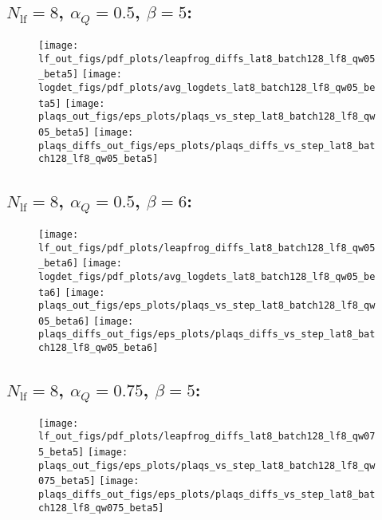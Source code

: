 \clearpage
\subsection{\texorpdfstring{$N_{\mathrm{lf}} = 8$}{Nlf = 8}, \texorpdfstring{$\alpha_Q = 0.5$}{alphaq = 0.5},
\texorpdfstring{$\beta = 5$}{beta = 5}:}
%
\begin{figure}[htpb]
  \centering
  \texttt{[image: lf\_out\_figs/pdf\_plots/leapfrog\_diffs\_lat8\_batch128\_lf8\_qw05\_beta5]}
  \hfill
  \texttt{[image: logdet\_figs/pdf\_plots/avg\_logdets\_lat8\_batch128\_lf8\_qw05\_beta5]}
  \hfill
  \texttt{[image: plaqs\_out\_figs/eps\_plots/plaqs\_vs\_step\_lat8\_batch128\_lf8\_qw05\_beta5]}
  \hfill
  \texttt{[image: plaqs\_diffs\_out\_figs/eps\_plots/plaqs\_diffs\_vs\_step\_lat8\_batch128\_lf8\_qw05\_beta5]}
\end{figure}

\clearpage
\subsection{\texorpdfstring{$N_{\mathrm{lf}} = 8$}{Nlf = 8}, \texorpdfstring{$\alpha_Q = 0.5$}{alphaq = 0.5},
\texorpdfstring{$\beta = 6$}{beta = 6}:}
%
\begin{figure}[htpb]
  \centering
  \texttt{[image: lf\_out\_figs/pdf\_plots/leapfrog\_diffs\_lat8\_batch128\_lf8\_qw05\_beta6]}
  \hfill
  \texttt{[image: logdet\_figs/pdf\_plots/avg\_logdets\_lat8\_batch128\_lf8\_qw05\_beta6]}
  \hfill
  \texttt{[image: plaqs\_out\_figs/eps\_plots/plaqs\_vs\_step\_lat8\_batch128\_lf8\_qw05\_beta6]}
  \hfill
  \texttt{[image: plaqs\_diffs\_out\_figs/eps\_plots/plaqs\_diffs\_vs\_step\_lat8\_batch128\_lf8\_qw05\_beta6]}
\end{figure}

\clearpage
\subsection{\texorpdfstring{$N_{\mathrm{lf}} = 8$}{Nlf = 8}, \texorpdfstring{$\alpha_Q = 0.75$}{alphaq = 0.75},
\texorpdfstring{$\beta = 5$}{beta = 5}:}
%
\begin{figure}[htpb]
  \centering
  \texttt{[image: lf\_out\_figs/pdf\_plots/leapfrog\_diffs\_lat8\_batch128\_lf8\_qw075\_beta5]}
  \hfill
  \hfill 
  \texttt{[image: plaqs\_out\_figs/eps\_plots/plaqs\_vs\_step\_lat8\_batch128\_lf8\_qw075\_beta5]}
  \hfill
  \texttt{[image: plaqs\_diffs\_out\_figs/eps\_plots/plaqs\_diffs\_vs\_step\_lat8\_batch128\_lf8\_qw075\_beta5]}
\end{figure}

